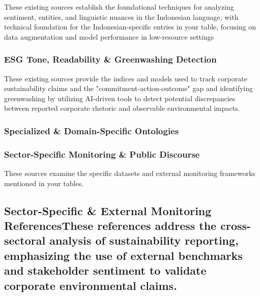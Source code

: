 \documentclass{article}
\begin{document}
These existing sources establish the foundational techniques for analyzing sentiment, entities, and linguistic nuances in the Indonesian language, with technical foundation for the Indonesian-specific entries in your table, focusing on data augmentation and model performance in low-resource settings
\subsubsection*{ESG Tone, Readability \& Greenwashing Detection}

These existing sources  provide the indices and models used to track corporate sustainability claims and the "commitment-action-outcome" gap and identifying greenwashing by utilizing AI-driven tools to detect potential discrepancies between reported corporate rhetoric and observable environmental impacts. 
\subsubsection*{Specialized \& Domain-Specific Ontologies}




\subsubsection*{Sector-Specific Monitoring \& Public Discourse}

These sources examine the specific datasets and external monitoring frameworks mentioned in your tables.


\subsection*{Sector-Specific \& External Monitoring ReferencesThese references address the cross-sectoral analysis of sustainability reporting, emphasizing the use of external benchmarks and stakeholder sentiment to validate corporate environmental claims. }
\end{document}
